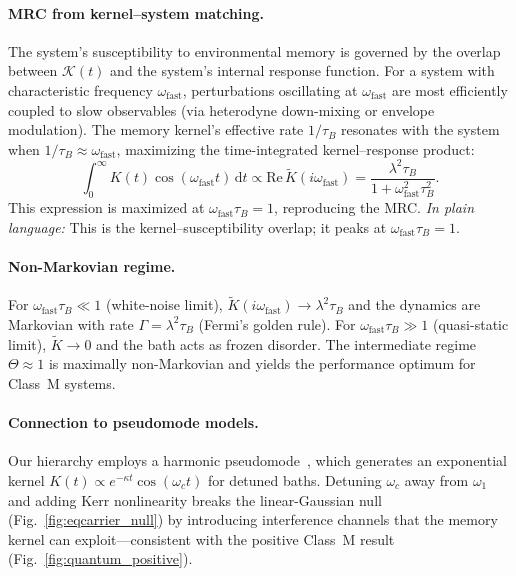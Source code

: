 \documentclass[11pt,letterpaper]{article}
\begin{document}
\paragraph{MRC from kernel--system matching.} The system's susceptibility to environmental memory is governed by the overlap between $\mathcal{K}(t)$ and the system's internal response function. For a system with characteristic frequency $\omega_{\mathrm{fast}}$, perturbations oscillating at $\omega_{\mathrm{fast}}$ are most efficiently coupled to slow observables (via heterodyne down-mixing or envelope modulation). The memory kernel's effective rate $1/\tau_B$ resonates with the system when $1/\tau_B \approx \omega_{\mathrm{fast}}$, maximizing the time-integrated kernel--response product:
\begin{equation}
\int_0^\infty K(t)\cos(\omega_{\mathrm{fast}} t)\,\mathrm{d}t \propto \text{Re}\,\tilde{K}(i\omega_{\mathrm{fast}}) = \frac{\lambda^2\tau_B}{1+\omega_{\mathrm{fast}}^2\tau_B^2}.
\label{eq:kernel_overlap}
\end{equation}
This expression is maximized at $\omega_{\mathrm{fast}}\tau_B = 1$, reproducing the MRC. \emph{In plain language:} This is the kernel--susceptibility overlap; it peaks at $\omega_{\mathrm{fast}}\tau_B = 1$.

\paragraph{Non-Markovian regime.} For $\omega_{\mathrm{fast}}\tau_B \ll 1$ (white-noise limit), $\tilde{K}(i\omega_{\mathrm{fast}})\to\lambda^2\tau_B$ and the dynamics are Markovian with rate $\Gamma=\lambda^2\tau_B$ (Fermi's golden rule). For $\omega_{\mathrm{fast}}\tau_B \gg 1$ (quasi-static limit), $\tilde{K}\to 0$ and the bath acts as frozen disorder. The intermediate regime $\Theta\approx 1$ is maximally non-Markovian and yields the performance optimum for Class~M systems.

\paragraph{Connection to pseudomode models.} Our hierarchy employs a harmonic pseudomode~\cite{Breuer2002}, which generates an exponential kernel $K(t)\propto e^{-\kappa t}\cos(\omega_c t)$ for detuned baths. Detuning $\omega_c$ away from $\omega_1$ and adding Kerr nonlinearity breaks the linear-Gaussian null (Fig.~\ref{fig:eqcarrier_null}) by introducing interference channels that the memory kernel can exploit—consistent with the positive Class~M result (Fig.~\ref{fig:quantum_positive}).
\end{document}
